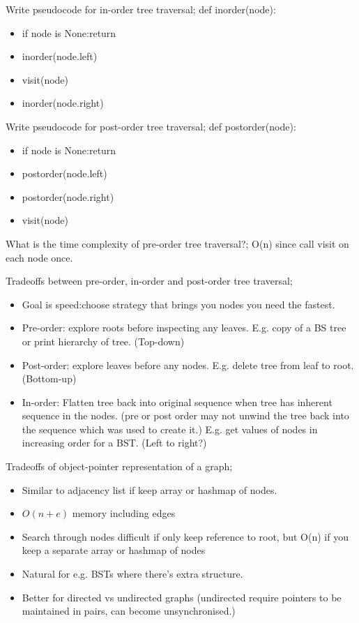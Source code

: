 \documentclass{article}
\begin{document}
Write pseudocode for in-order tree traversal; def inorder(node): \begin{itemize} \item if node is None:return \item inorder(node.left) \item visit(node) \item inorder(node.right) \end{itemize}

Write pseudocode for post-order tree traversal; def postorder(node): \begin{itemize} \item if node is None:return \item postorder(node.left) \item postorder(node.right) \item visit(node) \end{itemize}

What is the time complexity of pre-order tree traversal?; O(n) since call visit on each node once.

Tradeoffs between pre-order, in-order and post-order tree traversal; \begin{itemize} \item Goal is speed:choose strategy that brings you nodes you need the fastest.  \item Pre-order: explore roots before inspecting any leaves. E.g. copy of a BS tree or print hierarchy of tree. (Top-down) \item Post-order: explore leaves before any nodes. E.g. delete tree from leaf to root. (Bottom-up) \item In-order: Flatten tree back into original sequence when tree has inherent sequence in the nodes. (pre or post order may not unwind the tree back into the sequence which was used to create it.)	E.g. get values of nodes in increasing order for a BST. (Left to right?) \end{itemize} 

Tradeoffs of object-pointer representation of a graph; \begin{itemize} \item Similar to adjacency list if keep array or hashmap of nodes.  \item $O(n+e)$ memory including edges \item Search through nodes difficult if only keep reference to root, but O(n) if you keep a separate array or hashmap of nodes \item Natural for e.g. BSTs where there's extra structure.  \item Better for directed vs undirected graphs (undirected require pointers to be maintained in pairs, can become unsynchronised.) \end{itemize}
\end{document}
